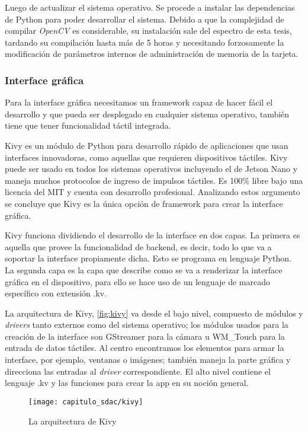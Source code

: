 Luego de actualizar el sistema operativo. Se procede a instalar las dependencias
de Python para poder desarrollar el sistema. Debido a que la complejidad de
compilar \emph{OpenCV} es considerable, su instalación sale del espectro de esta
tesis, tardando su compilación hasta más de 5 horas y necesitando forzosamente
la modificación de parámetros internos de administración de memoria de la
tarjeta.

\subsubsection{Interface gráfica}

Para la interface gráfica necesitamos un framework capaz de hacer fácil el
desarrollo y que pueda ser desplegado en cualquier sistema operativo, también
tiene que tener funcionalidad táctil integrada.

Kivy es un módulo de Python para desarrollo rápido de aplicaciones que usan
interfaces innovadoras, como aquellas que requieren dispositivos táctiles. Kivy
puede ser usado en todos los sistemas operativos incluyendo el de Jetson Nano y
maneja muchos protocolos de ingreso de impulsos táctiles. Es 100\% libre bajo
una licencia del MIT y cuenta con desarrollo profesional. Analizando estos
argumento se concluye que Kivy es la única opción de framework para crear la
interface gráfica.

Kivy funciona dividiendo el desarrollo de la interface en dos capas. La primera
es aquella que provee la funcionalidad de backend, es decir, todo lo que va a
soportar la interface propiamente dicha. Esto se programa en lenguaje Python. La
segunda capa es la capa que describe como se va a renderizar la interface
gráfica en el dispositivo, para ello se hace uso de un lenguaje de marcado
específico con extensión .kv.

La arquitectura de Kivy, \autoref{fig:kivy} va desde el bajo nivel, compuesto de
módulos y \emph{drivers} tanto externos como del sistema operativo; los módulos
usados para la creación de la interface son GStreamer para la cámara u WM\_Touch
para la entrada de datos táctiles. Al centro encontramos los elementos para
armar la interface, por ejemplo, ventanas o imágenes; también maneja la parte
gráfica y direcciona las entradas al \emph{driver} correspondiente. El alto
nivel contiene el lenguaje .kv y las funciones para crear la app en su noción
general.

\begin{figure}[H]
    \centering
    \texttt{[image: capitulo\_sdac/kivy]}
    \caption{La arquitectura de Kivy}\label{fig:kivy}
\end{figure}

